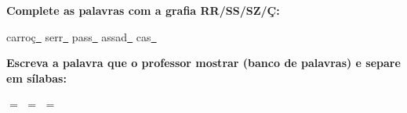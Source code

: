 \noindent\textbf{Complete as palavras com a grafia RR/SS/SZ/Ç:}
\begin{center}
  carroç\underline{~} \quad serr\underline{~} \quad pass\underline{~} \quad assad\underline{~} \quad cas\underline{~}
\end{center}

\noindent\textbf{Escreva a palavra que o professor mostrar (banco de palavras) e separe em sílabas:}

\begin{center}
  \underline{\hspace{2cm}} $=$ \underline{\hspace{2cm}} \quad \underline{\hspace{2cm}} $=$ \underline{\hspace{2cm}} \quad \underline{\hspace{2cm}} $=$ \underline{\hspace{2cm}}
  \end{center}



